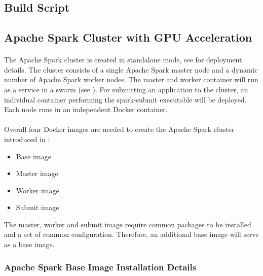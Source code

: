 \subsection{Build Script}


\subsection{Apache Spark Cluster with GPU Acceleration}
\paragraph{}The Apache Spark cluster is created in standalone mode, see  for deployment details.
The cluster consists of a single Apache Spark master node and a dynamic number of Apache Spark worker nodes. The master and worker container will run as a service in a swarm (see ).
For submitting an application to the cluster, an individual container performing the spark-submit executable will be deployed.
Each node runs in an independent Docker container.


\paragraph{}Overall four Docker images are needed to create the Apache Spark cluster introduced in :
\begin{itemize}
\item Base image
\item Master image
\item Worker image
\item Submit image
\end{itemize}
The master, worker and submit image require common packages to be installed and a set of common configuration. Therefore, an additional base image will serve as a base image.

\subsubsection{Apache Spark Base Image Installation Details}

